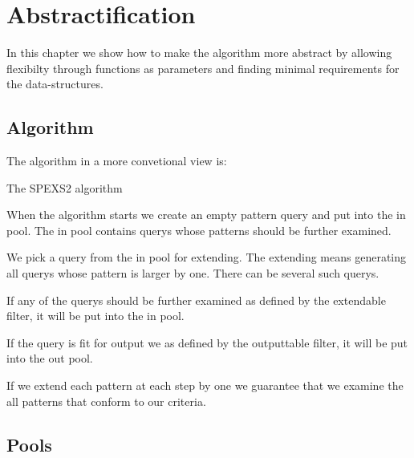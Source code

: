 \chapter{Abstractification}

In this chapter we show how to make the algorithm more 
abstract by allowing flexibilty through functions as parameters and
finding minimal requirements for the data-structures.

\section{Algorithm}

The algorithm in a more convetional view is:

\begin{algorithm}[H]
	\caption{The SPEXS2 algorithm}
\begin{algorithmic}[1]
			\EndIf
			\EndIf
		\EndFor
	\EndWhile
\end{algorithmic}
\end{algorithm}

When the algorithm starts we create an empty pattern query and put 
into the in pool. The in pool contains querys whose patterns
should be further examined.

We pick a query from the in pool for extending. The extending means
generating all querys whose pattern is larger by one. There can be
several such querys.

If any of the querys should be further examined as defined by the
extendable filter, it will be put into the in pool.

If the query is fit for output we as defined by the outputtable filter,
it will be put into the out pool.

If we extend each pattern at each step by one we guarantee that we
examine the all patterns that conform to our criteria.

\section{Pools}

